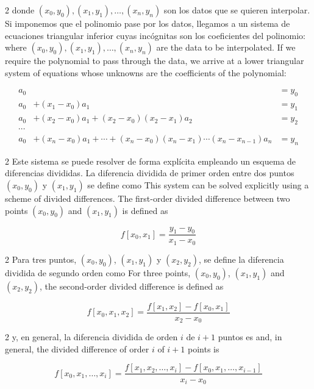 \begin{paracol}{2}
donde $(x_0, y_0), (x_1,y_1), \dots, (x_n, y_n)$ son los datos que se quieren interpolar. Si imponemos que el polinomio pase por los datos, llegamos a un sistema de ecuaciones triangular inferior cuyas incógnitas son los coeficientes del polinomio:
\switchcolumn
where $(x_0, y_0), (x_1,y_1), \dots, (x_n, y_n)$ are the data to be interpolated. If we require the polynomial to pass through the data, we arrive at a lower triangular system of equations whose unknowns are the coefficients of the polynomial:
\end{paracol}
\begin{align*}
a_0&&=y_0\\
a_0&+(x_1-x_0)a_1&=y_1\\
a_0&+(x_2-x_0)a_1+(x_2-x_0)(x_2-x_1)a_2&=y_2\\
\cdots\\
a_0&+(x_n-x_0)a_1+\cdots+(x_n-x_0)(x_n-x_1)\cdots (x_n-x_{n-1})a_n&=y_n
\end{align*}
\begin{paracol}{2}
Este sistema se puede resolver de forma explícita empleando un esquema de diferencias divididas. La diferencia dividida de primer orden entre dos puntos $(x_0,y_0)$ y $(x_1,y_1)$ se define como
\switchcolumn
This system can be solved explicitly using a scheme of divided differences. The first-order divided difference between two points $(x_0,y_0)$ and $(x_1,y_1)$ is defined as
\end{paracol}
\begin{equation*}
f\left[x_0,x_1\right]=\frac{y_1-y_0}{x_1-x_0}
\end{equation*}
\begin{paracol}{2}
Para tres puntos, $(x_0,y_0)$, $(x_1,y_1)$ y $(x_2,y_2)$, se define la diferencia dividida de segundo orden como
\switchcolumn
For three points, $(x_0,y_0)$, $(x_1,y_1)$ and $(x_2,y_2)$, the second-order divided difference is defined as
\end{paracol}
\begin{equation*}
f\left[x_0,x_1,x_2\right]=\frac{f\left[x_1,x_2\right]-f\left[x_0,x_1\right]}{x_2-x_0}
\end{equation*}
\begin{paracol}{2}
y, en general, la diferencia dividida de orden $i$ de $i+1$ puntos es
\switchcolumn
and, in general, the divided difference of order $i$ of $i+1$ points is
\end{paracol}
\begin{equation*}
f\left[x_0,x_1,\dots,x_i\right]=\frac{f\left[x_1,x_2,\dots,x_i\right]-f\left[x_0,x_1,\dots,x_{i-1}\right]}{x_i-x_0}
\end{equation*}
